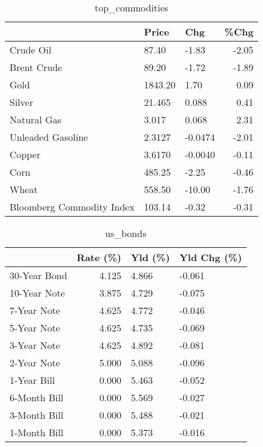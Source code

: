 \documentclass{article}%
\begin{document}
\begin{table}[htbp]%
\caption{top\_commodities}%
\centering%
\begin{adjustbox}{width=1\textwidth}%
\begin{tabular}{lllr}
\toprule
                          &   Price &     Chg &  \%Chg \\
\midrule
               Crude Oil  &   87.40 &   -1.83 & -2.05 \\
             Brent Crude  &   89.20 &   -1.72 & -1.89 \\
                    Gold  & 1843.20 &    1.70 &  0.09 \\
                  Silver  &  21.465 &   0.088 &  0.41 \\
             Natural Gas  &   3.017 &   0.068 &  2.31 \\
       Unleaded Gasoline  &  2.3127 & -0.0474 & -2.01 \\
                  Copper  &  3.6170 & -0.0040 & -0.11 \\
                    Corn  &  485.25 &   -2.25 & -0.46 \\
                   Wheat  &  558.50 &  -10.00 & -1.76 \\
Bloomberg Commodity Index &  103.14 &   -0.32 & -0.31 \\
\bottomrule
\end{tabular}
%
\end{adjustbox}%
\end{table}

%


\begin{table}[htbp]%
\caption{us\_bonds}%
\centering%
\begin{adjustbox}{width=1\textwidth}%
\begin{tabular}{lrll}
\toprule
             &  Rate (\%) & Yld (\%) & Yld Chg (\%) \\
\midrule
30-Year Bond &     4.125 &   4.866 &      -0.061 \\
10-Year Note &     3.875 &   4.729 &      -0.075 \\
 7-Year Note &     4.625 &   4.772 &      -0.046 \\
 5-Year Note &     4.625 &   4.735 &      -0.069 \\
 3-Year Note &     4.625 &   4.892 &      -0.081 \\
 2-Year Note &     5.000 &   5.088 &      -0.096 \\
 1-Year Bill &     0.000 &   5.463 &      -0.052 \\
6-Month Bill &     0.000 &   5.569 &      -0.027 \\
3-Month Bill &     0.000 &   5.488 &      -0.021 \\
1-Month Bill &     0.000 &   5.373 &      -0.016 \\
\bottomrule
\end{tabular}
%
\end{adjustbox}%
\end{table}
\end{document}
